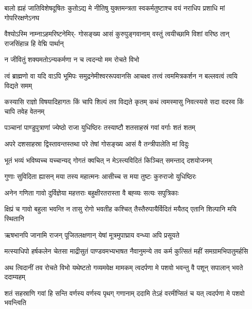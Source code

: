 \fourlineindentedshloka
{बालो ह्यहं जातिविशेषदूषितः}
{कुतोऽद्य मे नीतिषु युक्तमन्त्रता}
{स्वकर्मतुष्टाश्च वयं नराधिप}
{प्रशाधि मां गोपरिरक्षणेऽनघ}


\fourlineindentedshloka
{वैश्योऽस्मि नाम्नाऽहमरिष्टनेमिर्-}
{गोसङ्ख्य आसं कुरुपुङ्गवानाम्}
{वस्तुं त्वयीच्छामि विशां वरिष्ठ}
{तान् राजसिंहान्न हि वेद्मि पार्थान्}


\onelineindentedshloka
{न जीवितुं शक्यमतोऽन्यकर्मणा}
{न च त्वदन्यो मम रोचते विभो}





\fourlineindentedshloka
{त्वं ब्राह्मणो वा यदि वाऽपि भूमिपः}
{समुद्रनेमीश्वररूपवानसि}
{आचक्ष्व तत्त्वं त्वममित्रकर्शन}
{न बल्लवत्वं त्वयि विद्यते समम्}


\fourlineindentedshloka
{कस्यासि राज्ञो विषयादिहागतः}
{किं चापि शिल्पं तव विद्यते कृतम्}
{कथं त्वमस्मासु निवत्स्यसे सदा}
{वदस्व किं चापि तवेह वेतनम्}




\twolineshloka
{पञ्चानां पाण्डुपुत्राणां ज्येष्ठो राजा युधिष्ठिरः}
{तस्याष्टौ शतसाहस्रं गवां वर्गाः शतं शतम्}


\twolineshloka
{अपरे दशसाहस्रा द्विस्तावन्तस्तथा परे}
{तेषां गोसङ्ख्य आसं वै तन्त्रीपालेति मां विदुः}


\twolineshloka
{भूतं भव्यं भविष्यच्च यच्चान्यद् गोगतं क्वचित्}
{न मेऽस्त्यविदितं किञ्चित् समन्ताद् दशयोजनम्}


\twolineshloka
{गुणाः सुविदिता ह्यासन् मया तस्य महात्मनः}
{आसीच्च स मया तुष्टः कुरुराजो युधिष्ठिरः}


\twolineshloka
{अनेन गणिता गावो दुर्विज्ञेया महत्तराः}
{बहुक्षीरतरास्ता वै बह्व्यः सत्यः सपुत्रिकाः}


\fourlineindentedshloka
{क्षिप्रं च गावो बहुला भवन्ति}
{न तासु रोगो भवतीह कश्चित्}
{तैस्तैरुपायैर्विदितं मयैतद्}
{एतानि शिल्पानि मयि स्थितानि}


\twolineshloka
{ऋषभानपि जानामि राजन् पूजितलक्षणान्}
{येषां मूत्रमुपाघ्राय वन्ध्या अपि प्रसूयते}



\fourlineindentedshloka
{मत्स्याधिपो हर्षकलेन चेतसा}
{माद्रीसुतं पाण्डवमभ्यभाषत}
{नैवानुमन्ये तव कर्म कुत्सितं}
{महीं समग्रामभिपातुमर्हसि}


\fourlineindentedshloka
{अथ त्विदानीं तव रोचते विभो}
{यथेष्टतो गव्यमवेक्ष मामकम्}
{त्वदर्पणा मे पशवो भवन्तु वै}
{पशून् सपालान् भवते ददाम्यहम्}


\fourlineindentedshloka
{शतं सहस्राणि गवां हि सन्ति}
{वर्णस्य वर्णस्य पृथग् गणानाम्}
{ददामि तेऽहं वरमीप्सितं च यत्}
{त्वदर्पणा मे पशवो भवन्त्विति}


